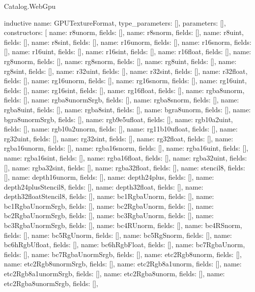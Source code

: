 \begin{lexlean}{Catalog.WebGpu}
\begin{semanticmodule}
inductive{
  name: GPUTextureFormat,
  type_parameters: [],
  parameters: [],
  constructors: [
    {name: r8unorm, fields: []},
    {name: r8snorm, fields: []},
    {name: r8uint, fields: []},
    {name: r8sint, fields: []},
    {name: r16unorm, fields: []},
    {name: r16snorm, fields: []},
    {name: r16uint, fields: []},
    {name: r16sint, fields: []},
    {name: r16float, fields: []},
    {name: rg8unorm, fields: []},
    {name: rg8snorm, fields: []},
    {name: rg8uint, fields: []},
    {name: rg8sint, fields: []},
    {name: r32uint, fields: []},
    {name: r32sint, fields: []},
    {name: r32float, fields: []},
    {name: rg16unorm, fields: []},
    {name: rg16snorm, fields: []},
    {name: rg16uint, fields: []},
    {name: rg16sint, fields: []},
    {name: rg16float, fields: []},
    {name: rgba8unorm, fields: []},
    {name: rgba8unormSrgb, fields: []},
    {name: rgba8snorm, fields: []},
    {name: rgba8uint, fields: []},
    {name: rgba8sint, fields: []},
    {name: bgra8unorm, fields: []},
    {name: bgra8unormSrgb, fields: []},
    {name: rgb9e5ufloat, fields: []},
    {name: rgb10a2uint, fields: []},
    {name: rgb10a2unorm, fields: []},
    {name: rg11b10ufloat, fields: []},
    {name: rg32uint, fields: []},
    {name: rg32sint, fields: []},
    {name: rg32float, fields: []},
    {name: rgba16unorm, fields: []},
    {name: rgba16snorm, fields: []},
    {name: rgba16uint, fields: []},
    {name: rgba16sint, fields: []},
    {name: rgba16float, fields: []},
    {name: rgba32uint, fields: []},
    {name: rgba32sint, fields: []},
    {name: rgba32float, fields: []},
    {name: stencil8, fields: []},
    {name: depth16unorm, fields: []},
    {name: depth24plus, fields: []},
    {name: depth24plusStencil8, fields: []},
    {name: depth32float, fields: []},
    {name: depth32floatStencil8, fields: []},
    {name: bc1RgbaUnorm, fields: []},
    {name: bc1RgbaUnormSrgb, fields: []},
    {name: bc2RgbaUnorm, fields: []},
    {name: bc2RgbaUnormSrgb, fields: []},
    {name: bc3RgbaUnorm, fields: []},
    {name: bc3RgbaUnormSrgb, fields: []},
    {name: bc4RUnorm, fields: []},
    {name: bc4RSnorm, fields: []},
    {name: bc5RgUnorm, fields: []},
    {name: bc5RgSnorm, fields: []},
    {name: bc6hRgbUfloat, fields: []},
    {name: bc6hRgbFloat, fields: []},
    {name: bc7RgbaUnorm, fields: []},
    {name: bc7RgbaUnormSrgb, fields: []},
    {name: etc2Rgb8unorm, fields: []},
    {name: etc2Rgb8unormSrgb, fields: []},
    {name: etc2Rgb8a1unorm, fields: []},
    {name: etc2Rgb8a1unormSrgb, fields: []},
    {name: etc2Rgba8unorm, fields: []},
    {name: etc2Rgba8unormSrgb, fields: []},
}
\end{semanticmodule}
\end{lexlean}
